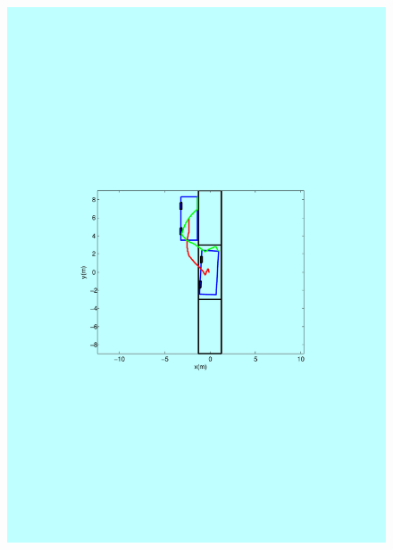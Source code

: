 \documentclass[12pt,a4paper]{report}
\begin{document}
\begin{CJK}{UTF8}{bkai}
\begin{figure}[!h]
{\includegraphics[scale=0.3]{./pics/matlab_example.pdf}}
\subfigure[裁切後]{
}
\end{figure}
\end{CJK}
\end{document}
